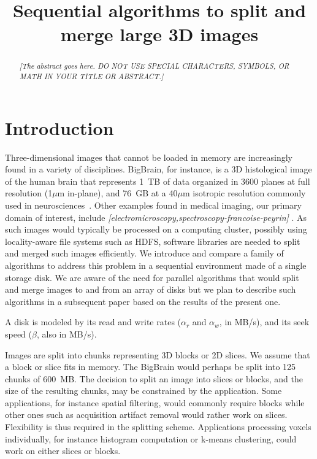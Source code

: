 \documentclass[10pt, conference, compsocconf]{IEEEtran}
\newcommand{\todo}[1]{
  \color{red}\emph{[#1]}
  \color{black}
}
\begin{document}
\title{Sequential algorithms to split and merge large 3D images}

\maketitle

\begin{abstract}
\todo{The abstract goes here. DO NOT USE SPECIAL CHARACTERS, SYMBOLS, OR MATH IN YOUR TITLE OR ABSTRACT.}
\end{abstract}


\section{Introduction}

Three-dimensional images that cannot be loaded in memory are
increasingly found in a variety of disciplines. BigBrain, for
instance, is a 3D histological image of the human brain that
represents 1~TB of data organized in 3600 planes at full resolution
(1$\mu$m in-plane), and 76~GB at a 40$\mu$m isotropic resolution
commonly used in neurosciences~\cite{amunts2013bigbrain}. Other
examples found in medical imaging, our primary domain of interest,
include \todo{electromicroscopy,spectroscopy-francoise-peyrin}. As
such images would typically be processed on a computing cluster,
possibly using locality-aware file systems such as HDFS, software
libraries are needed to split and merged such images efficiently. We
introduce and compare a family of algorithms to address this problem
in a sequential environment made of a single storage disk. We are
aware of the need for parallel algorithms that would split and merge
images to and from an array of disks but we plan to describe such
algorithms in a subsequent paper based on the results of the present
one.

A disk is modeled by its read and write rates ($\alpha_r$ and
$\alpha_w$, in MB/s), and its seek speed ($\beta$, also in
MB/s).

Images are split into chunks representing 3D blocks or 2D slices. We
assume that a block or slice fits in memory. The BigBrain would
perhaps be split into 125 chunks of 600~MB. The decision to split an
image into slices or blocks, and the size of the resulting chunks, may
be constrained by the application. Some applications, for instance
spatial filtering, would commonly require blocks while other ones such
as acquisition artifact removal would rather work on
slices. Flexibility is thus required in the splitting
scheme. Applications processing voxels individually, for instance
histogram computation or k-means clustering, could work on either
slices or blocks.
\end{document}
